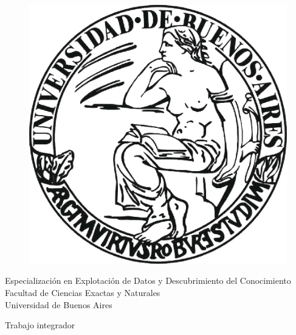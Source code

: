 \documentclass[10 pt]{article}
\begin{document}
\listoftodos

\begin{titlepage}

    \begin{center}
    \vspace*{-0.5in}
    \begin{figure}[htb]
    \begin{center}
    \includegraphics[scale=.3]{images/uba2.jpg}
    \end{center}
    \end{figure}
    
    \begin{large}
    Especialización en Explotación de Datos y Descubrimiento del Conocimiento\\
    \vspace*{0.15in}
    Facultad de Ciencias Exactas y Naturales \\
    \vspace*{0.15in}
    Universidad de Buenos Aires \\
    
    \vspace*{0.6in}
    \end{large}
    
    \begin{large}
    Trabajo integrador\\


\end{large}
\end{center}
\end{titlepage}
\end{document}
